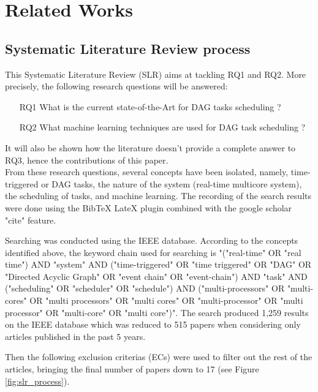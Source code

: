 
\section{Related Works}
\label{sec:literature}

\subsection{Systematic Literature Review process}

This Systematic Literature Review (SLR) aims at tackling RQ1 and RQ2. More precisely, the following research questions will be answered:

\begin{itemize}
    \item [RQ1] What is the current state-of-the-Art for DAG tasks scheduling ?        
    \item [RQ2] What machine learning  techniques are used for DAG task scheduling ?
\end{itemize}
It will also be shown how the literature doesn't provide 
a complete answer to RQ3, hence the contributions of this paper.\\

From these research questions, several concepts have been isolated,
namely, time-triggered or DAG tasks, the nature of the system (real-time multicore system),
the scheduling of tasks, and machine learning.
The recording of the search results were done using the BibTeX LateX plugin
combined with the google scholar "cite" feature.

Searching was conducted using the IEEE database.
According to the concepts identified above, 
the keyword chain used for searching is
"("real-time" OR "real time") AND 
"system" AND ("time-triggered" OR "time triggered" OR "DAG" OR "Directed Acyclic Graph" OR "event chain" OR "event-chain") 
AND "task" 
AND ("scheduling" OR "scheduler" OR "schedule") 
AND ("multi-processors" OR "multi-cores" OR "multi processors" OR 
"multi cores" OR "multi-processor" OR "multi processor" OR 
"multi-core" OR "multi core")".
The search produced 1,259 results on the IEEE database
which was reduced to 515 papers when considering only 
articles published in the past 5 years.

Then the following exclusion criterias (ECs) were used to filter out 
the rest of the articles, bringing the final number of papers down to 17
(see Figure \ref{fig:slr_process}).

